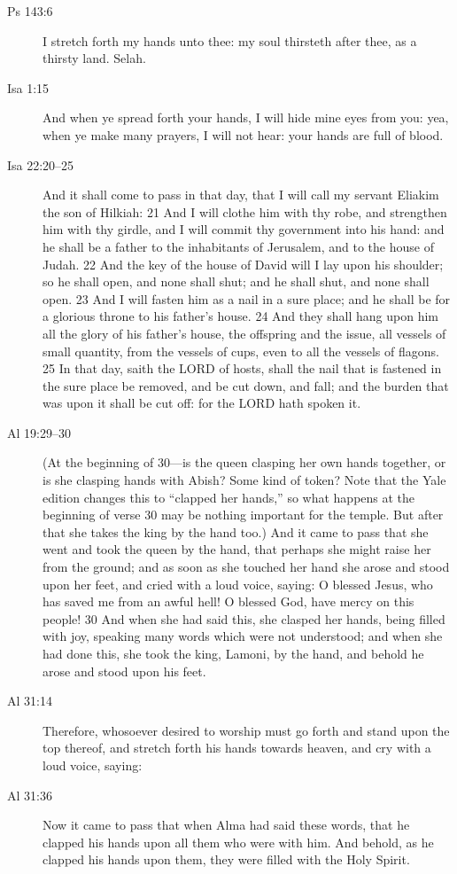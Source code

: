 \begin{description}
			\item[Ps 143:6] I stretch forth my hands unto thee: my soul thirsteth after thee, as a thirsty land. Selah.
			\item[Isa 1:15] And when ye spread forth your hands, I will hide mine eyes from you: yea, when ye make many prayers, I will not hear: your hands are full of blood.
			\item[Isa 22:20--25] And it shall come to pass in that day, that I will call my servant Eliakim the son of Hilkiah: 21 And I will clothe him with thy robe, and strengthen him with thy girdle, and I will commit thy government into his hand: and he shall be a father to the inhabitants of Jerusalem, and to the house of Judah. 22 And the key of the house of David will I lay upon his shoulder; so he shall open, and none shall shut; and he shall shut, and none shall open. 23 And I will fasten him as a nail in a sure place; and he shall be for a glorious throne to his father's house. 24 And they shall hang upon him all the glory of his father's house, the offspring and the issue, all vessels of small quantity, from the vessels of cups, even to all the vessels of flagons. 25 In that day, saith the LORD of hosts, shall the nail that is fastened in the sure place be removed, and be cut down, and fall; and the burden that was upon it shall be cut off: for the LORD hath spoken it.
			\item[Al 19:29--30] (At the beginning of 30---is the queen clasping her own hands together, or is she clasping hands with Abish? Some kind of token? Note that the Yale edition changes this to ``clapped her hands,'' so what happens at the beginning of verse 30 may be nothing important for the temple. But after that she takes the king by the hand too.) And it came to pass that she went and took the queen by the hand, that perhaps she might raise her from the ground; and as soon as she touched her hand she arose and stood upon her feet, and cried with a loud voice, saying: O blessed Jesus, who has saved me from an awful hell! O blessed God, have mercy on this people! 30 And when she had said this, she clasped her hands, being filled with joy, speaking many words which were not understood; and when she had done this, she took the king, Lamoni, by the hand, and behold he arose and stood upon his feet.
			\item[Al 31:14] Therefore, whosoever desired to worship must go forth and stand upon the top thereof, and stretch forth his hands towards heaven, and cry with a loud voice, saying:
			\item[Al 31:36] Now it came to pass that when Alma had said these words, that he clapped his hands upon all them who were with him. And behold, as he clapped his hands upon them, they were filled with the Holy Spirit.

\end{description}
